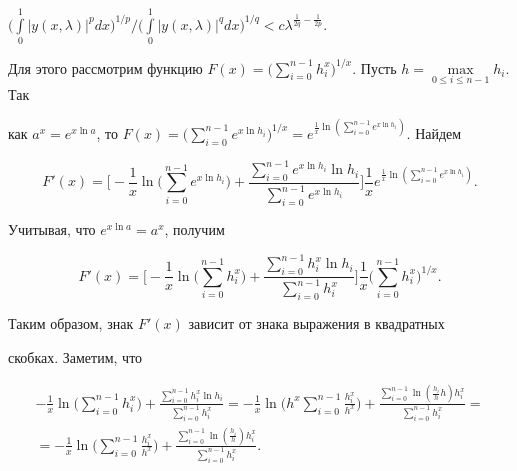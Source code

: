 $\Big(\int\limits^1_0|y(x,\lambda)|^p dx\Big)^{1/p}\Big/ 


\Big(\int\limits^1_0|y(x,\lambda)|^q dx\Big)^{1/q} 


<c\lambda^{\frac{1}{2q}-\frac{1}{2p}}$. 


 


Для этого рассмотрим функцию $F(x)=\Big(\sum\limits^{n-1}_{i=0} 


h^x_i\Big)^{1/x}$. Пусть $h=\max\limits_{0\le i\le n-1}h_i$. Так 


как $a^x=e^{x\ln a}$, то $F(x)=\Big(\sum\limits^{n-1}_{i=0} e^{x\ln 


h_i}\Big)^{1/x}=e^{\frac{1}{x}\ln\left( \sum^{n-1}_{i=0}e^{x\ln 


h_i}\right)}$. Найдем 


$$ 


F'(x)=\bigg[-\frac{1}{x}\ln\bigg(\sum^{n-1}_{i=0}e^{x\ln h_i} \bigg) 


+\frac{\sum^{n-1}_{i=0}e^{x\ln h_i}\ln h_i} 


{\sum^{n-1}_{i=0}e^{x\ln h_i}}\bigg]\frac{1}{x} 


e^{\frac{1}{x}\ln\left(\sum^{n-1}_{i=0}e^{x\ln h_i}\right)}. 


$$ 


Учитывая, что $e^{x\ln a}=a^x$, получим 


$$ 


F'(x)=\bigg[-\frac{1}{x}\ln\bigg(\sum^{n-1}_{i=0} h^x_i\bigg)+ 


\frac{\sum^{n-1}_{i=0}h^x_i\ln h_i} 


{\sum^{n-1}_{i=0}h^x_i}\bigg]\frac{1}{x} 


\bigg(\sum^{n-1}_{i=0}h^x_i \bigg)^{1/x}. 


$$ 


Таким образом, знак $F'(x)$ зависит от знака выражения в квадратных 


скобках. Заметим, что 


\begin{multline} 


-\frac{1}{x}\ln\bigg(\sum^{n-1}_{i=0}h^x_i \bigg)+ 


\frac{\sum^{n-1}_{i=0}h^x_i\ln h_i} 


{\sum^{n-1}_{i=0}h^x_i}=-\frac{1}{x}\ln\bigg(h^x 


\sum^{n-1}_{i=0}\frac{h^x_i}{h^x}\bigg)+ 


\frac{\sum^{n-1}_{i=0}\ln\left(\frac{h_i}{h}h\right)h^x_i} 


{\sum^{n-1}_{i=0}h^x_i}= \\ =-\frac{1}{x}\ln\bigg( 


\sum^{n-1}_{i=0}\frac{h^x_i}{h^x}\bigg)+ 


\frac{\sum^{n-1}_{i=0}\ln\left(\frac{h_i}{h}\right)h^x_i} 


{\sum^{n-1}_{i=0}h^x_i}. 


\end{multline} 



